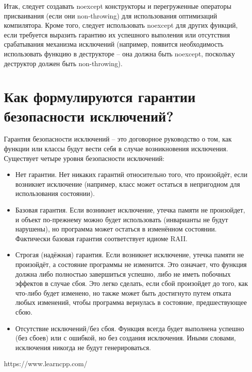 \documentclass[a4paper,12pt]{article}	%
\begin{document}
	Итак, следует создавать noexcept конструкторы и перегруженные операторы присваивания (если они non-throwing) для использования оптимизаций компилятора. Кроме того, следует использовать noexcept для других функций, если требуется выразить гарантию их успешного выполения или отсутствия срабатывания механизма исключений (например, появится необходимость использовать функцию в деструкторе -- она должна быть noexcept, поскольку деструктор должен быть non-throwing).

\newpage

\section{Как формулируются гарантии безопасности исключений?}

	Гарантия безопасности исключений -- это договорное руководство о том, как функции или классы будут вести себя в случае возникновения исключения. Существует четыре уровня безопасности исключений:
	
	\begin{itemize}
		
		\item Нет гарантии. Нет никаких гарантий относительно того, что произойдёт, если возникнет исключение (например, класс может остаться в непригодном для использования состоянии).
	
		\item Базовая гарантия. Если возникнет исключение, утечка памяти не произойдет, и объект по-прежнему можно будет использовать (инварианты не будут нарушены), но программа может остаться в изменённом состоянии. Фактически базовая гарантия соответствует идиоме RAII.
		
		\item Строгая (надёжная) гарантия. Если возникнет исключение, утечка памяти не произойдёт, а состояние программы не изменится. Это означает, что функция должна либо полностью завершиться успешно, либо не иметь побочных эффектов в случае сбоя. Это легко сделать, если сбой произойдет до того, как что-либо будет изменено, но также может быть достигнуто путем отката любых изменений, чтобы программа вернулась в состояние, предшествующее сбою.
		
		\item Отсутствие исключений/без сбоя. Функция всегда будет выполнена успешно (без сбоев) или с ошибкой, но без создания исключения. Иными словами, исключения никогда не будут генерироваться.
	
	\end{itemize}

	
\newpage


 
	\begin{thebibliography}{}
    	 https://www.learncpp.com/
	\end{thebibliography}
\end{document}
